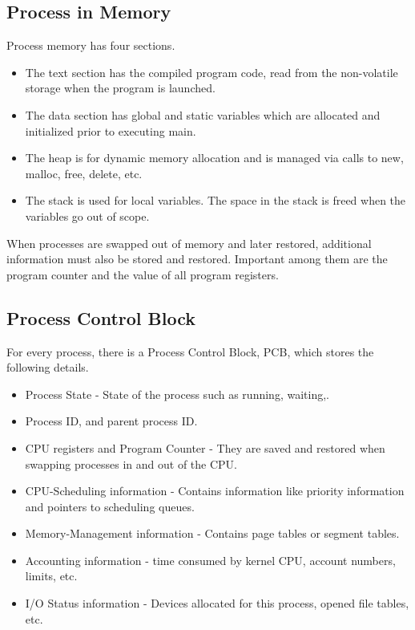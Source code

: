 \documentclass[12pt]{report}
\begin{document}
\subsection{Process in Memory}
Process memory has four sections.
\begin{itemize}
	\item The text section has the compiled program code, read from the non-volatile storage when the program is launched.
	\item The data section has global and static variables which are allocated and initialized prior to executing main.
	\item The heap is for dynamic memory allocation and is managed via calls to new, malloc, free, delete, etc.
	\item The stack is used for local variables. The space in the stack is freed when the variables go out of scope. 
\end{itemize}        
When processes are swapped out of memory and later restored, additional information must also be stored and restored. Important among them are the program counter and the value of all program registers.



\subsection{Process Control Block}
For every process, there is a Process Control Block, PCB, which stores the following details.

\begin{itemize}
	\item    Process State - State of the process such as running, waiting,.
	\item    Process ID, and parent process ID.
	\item    CPU registers and Program Counter - They are saved and restored when swapping processes in and out of the CPU.
	\item    CPU-Scheduling information - Contains information like priority information and pointers to scheduling queues.
	\item    Memory-Management information - Contains page tables or segment tables.
	\item    Accounting information - time consumed by kernel CPU, account numbers, limits, etc.
	\item    I/O Status information - Devices allocated for this process, opened file tables, etc.
\end{itemize}
\end{document}
